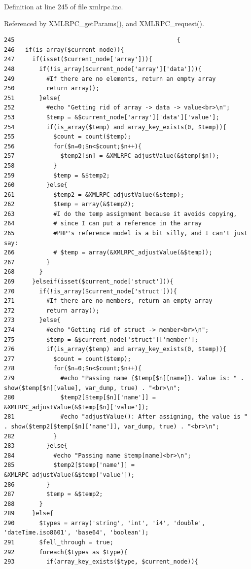 Definition at line 245 of file xmlrpc.inc.

Referenced by XMLRPC\_\-getParams(), and XMLRPC\_\-request().

\begin{Code}\begin{verbatim}245                                              {
246   if(is_array($current_node)){
247     if(isset($current_node['array'])){
248       if(!is_array($current_node['array']['data'])){
249         #If there are no elements, return an empty array
250         return array();
251       }else{
252         #echo "Getting rid of array -> data -> value<br>\n";
253         $temp = &$current_node['array']['data']['value'];
254         if(is_array($temp) and array_key_exists(0, $temp)){
255           $count = count($temp);
256           for($n=0;$n<$count;$n++){
257             $temp2[$n] = &XMLRPC_adjustValue(&$temp[$n]);
258           }
259           $temp = &$temp2;
260         }else{
261           $temp2 = &XMLRPC_adjustValue(&$temp);
262           $temp = array(&$temp2);
263           #I do the temp assignment because it avoids copying,
264           # since I can put a reference in the array
265           #PHP's reference model is a bit silly, and I can't just say:
266           # $temp = array(&XMLRPC_adjustValue(&$temp));
267         }
268       }
269     }elseif(isset($current_node['struct'])){
270       if(!is_array($current_node['struct'])){
271         #If there are no members, return an empty array
272         return array();
273       }else{
274         #echo "Getting rid of struct -> member<br>\n";
275         $temp = &$current_node['struct']['member'];
276         if(is_array($temp) and array_key_exists(0, $temp)){
277           $count = count($temp);
278           for($n=0;$n<$count;$n++){
279             #echo "Passing name {$temp[$n][name]}. Value is: " . show($temp[$n][value], var_dump, true) . "<br>\n";
280             $temp2[$temp[$n]['name']] = &XMLRPC_adjustValue(&$temp[$n]['value']);
281             #echo "adjustValue(): After assigning, the value is " . show($temp2[$temp[$n]['name']], var_dump, true) . "<br>\n";
282           }
283         }else{
284           #echo "Passing name $temp[name]<br>\n";
285           $temp2[$temp['name']] = &XMLRPC_adjustValue(&$temp['value']);
286         }
287         $temp = &$temp2;
288       }
289     }else{
290       $types = array('string', 'int', 'i4', 'double', 'dateTime.iso8601', 'base64', 'boolean');
291       $fell_through = true;
292       foreach($types as $type){
293         if(array_key_exists($type, $current_node)){

\end{verbatim}
\end{Code}
